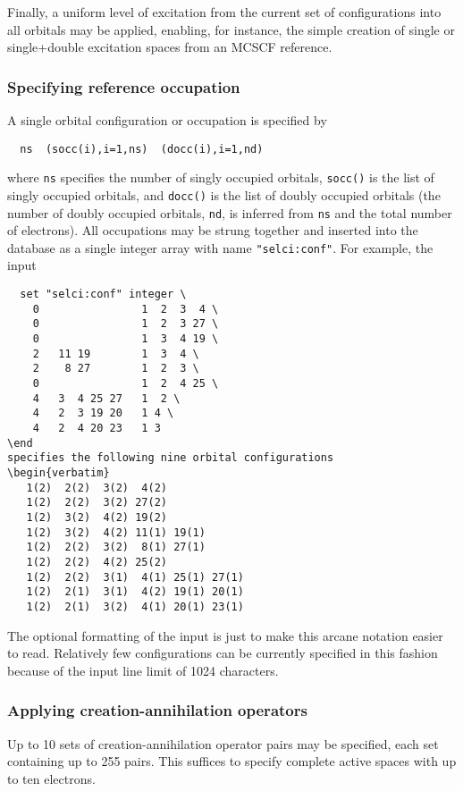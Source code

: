 Finally, a uniform level of excitation from the current set of
configurations into all orbitals may be applied, enabling, for
instance, the simple creation of single or single+double excitation 
spaces from an MCSCF reference.

\subsubsection{Specifying reference occupation}

A single orbital configuration or occupation is specified by
\begin{verbatim}
  ns  (socc(i),i=1,ns)  (docc(i),i=1,nd)
\end{verbatim}
where \verb+ns+ specifies the number of singly occupied orbitals,
\verb+socc()+ is the list of singly occupied orbitals, and
\verb+docc()+ is the list of doubly occupied orbitals (the
number of doubly occupied orbitals, \verb+nd+, is inferred from
\verb+ns+ and the total number of electrons).  All occupations may be
strung together and inserted into the database as a single integer
array with name \verb+"selci:conf"+.  For example, the input
\begin{verbatim}
  set "selci:conf" integer \
    0                1  2  3  4 \
    0                1  2  3 27 \
    0                1  3  4 19 \
    2   11 19        1  3  4 \
    2    8 27        1  2  3 \
    0                1  2  4 25 \
    4   3  4 25 27   1  2 \
    4   2  3 19 20   1 4 \
    4   2  4 20 23   1 3  
\end
specifies the following nine orbital configurations
\begin{verbatim}
   1(2)  2(2)  3(2)  4(2)
   1(2)  2(2)  3(2) 27(2)
   1(2)  3(2)  4(2) 19(2)
   1(2)  3(2)  4(2) 11(1) 19(1)
   1(2)  2(2)  3(2)  8(1) 27(1)
   1(2)  2(2)  4(2) 25(2)
   1(2)  2(2)  3(1)  4(1) 25(1) 27(1)
   1(2)  2(1)  3(1)  4(2) 19(1) 20(1)
   1(2)  2(1)  3(2)  4(1) 20(1) 23(1)
\end{verbatim}
The optional formatting of the input is just to make this arcane
notation easier to read.  Relatively few configurations can be
currently specified in this fashion because of the input line limit of
1024 characters.

\subsubsection{Applying creation-annihilation operators}

Up to 10 sets of creation-annihilation operator pairs may be
specified, each set containing up to 255 pairs.  This suffices to
specify complete active spaces with up to ten electrons.


